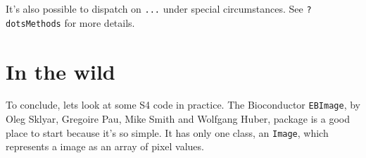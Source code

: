 \begin{Shaded}
\begin{Highlighting}[]
\NormalTok{(}\NormalTok{, }\NormalTok{(}\NormalTok{, }\NormalTok{), }\NormalTok{)}
\NormalTok{(}\NormalTok{, }\NormalTok{(}\NormalTok{, }\NormalTok{), }\NormalTok{)}

\NormalTok{(}\NormalTok{, } \NormalTok{)}
\StringTok{ }\NormalTok{(}\NormalTok{, }\NormalTok{)}

\end{Highlighting}
\end{Shaded}

It's also possible to dispatch on \texttt{...} under special
circumstances. See \texttt{?dotsMethods} for more details.

\hypertarget{in-the-wild}{%
\section{In the wild}\label{in-the-wild}}

To conclude, lets look at some S4 code in practice. The Bioconductor
\texttt{EBImage}, by Oleg Sklyar, Gregoire Pau, Mike Smith and Wolfgang
Huber, package is a good place to start because it's so simple. It has
only one class, an \texttt{Image}, which represents a image as an array
of pixel values.

\begin{Shaded}
\begin{Highlighting}[]
\NormalTok{ (}\NormalTok{,}
  \NormalTok{ (}\NormalTok{),}
  \NormalTok{ (}
   
\NormalTok{)}

\StringTok{ }
  \NormalTok{ (}
\NormalTok{\}    }
\end{Highlighting}
\end{Shaded}

